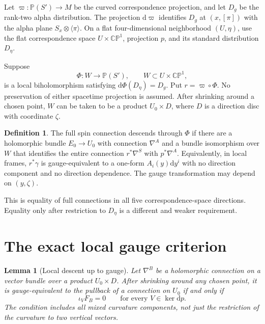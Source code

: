 \documentclass[11pt]{article}
\newtheorem{lemma}[theorem]{Lemma}
\theoremstyle{definition}
\newtheorem{definition}[theorem]{Definition}
\theoremstyle{remark}
\newcommand{\CP}{\mathbb{CP}}
\newcommand{\dd}{\mathrm d}
\begin{document}
Let $\varpi:\mathbb P(S')\to M$ be the curved correspondence projection,
and let $D_g$ be the rank-two alpha distribution. The projection
$\dd\varpi$ identifies $D_g$ at $(x,[\pi])$ with the alpha plane
$S_x\otimes\langle\pi\rangle$. On a flat four-dimensional neighborhood
$(U,\eta)$, use the flat correspondence space $U\times\CP^1$, projection
$p$, and its standard distribution $D_\eta$.

Suppose
\begin{equation}\label{obs:eq:inverse-chart}
 \Phi:W\longrightarrow\mathbb P(S'),
 \qquad W\subset U\times\CP^1,
\end{equation}
is a local biholomorphism satisfying
$\dd\Phi(D_\eta)=D_g$. Put $r=\varpi\circ\Phi$. No preservation of either
spacetime projection is assumed. After shrinking around a chosen point,
$W$ can be taken to be a product $U_0\times D$, where $D$ is a direction
disc with coordinate $\zeta$.

\begin{definition}\label{obs:def:full-descent}
The full spin connection descends through $\Phi$ if there are a holomorphic
bundle $E_0\to U_0$ with connection $\nabla^A$ and a bundle isomorphism over
$W$ that identifies the entire connection $r^*\nabla^S$ with
$p^*\nabla^A$. Equivalently, in local frames, $r^*\gamma$ is gauge-equivalent
to a one-form $A_i(y)\dd y^i$ with no direction component and no direction
dependence. The gauge transformation may depend on $(y,\zeta)$.
\end{definition}

This is equality of full connections in all five correspondence-space
directions. Equality only after restriction to $D_\eta$ is a different and
weaker requirement.

\section{The exact local gauge criterion}

\begin{lemma}[Local descent up to gauge]\label{obs:lem:basicness}
Let $\nabla^B$ be a holomorphic connection on a vector bundle over a product
$U_0\times D$. After shrinking around any chosen point, it is
gauge-equivalent to the pullback of a connection on $U_0$ if and only if
\begin{equation}\label{obs:eq:horizontal-curvature}
 \iota_V F_B=0\qquad\text{for every }V\in\ker\dd p.
\end{equation}
The condition includes all mixed curvature components, not just the
restriction of the curvature to two vertical vectors.
\end{lemma}
\end{document}
